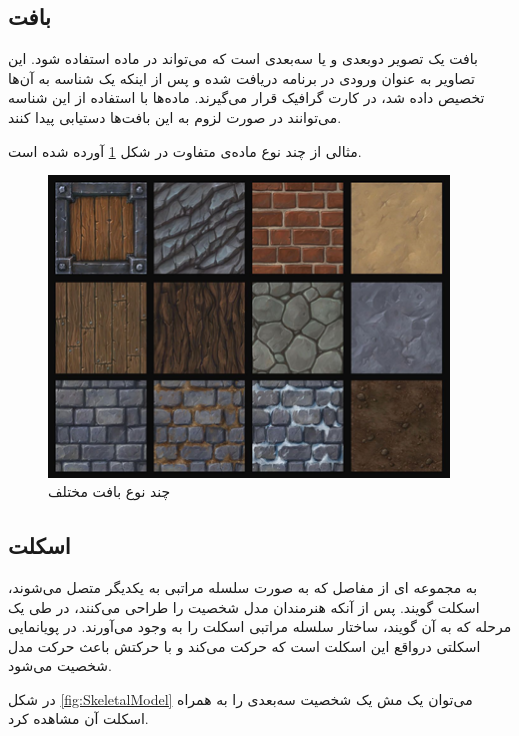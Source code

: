 \subsection{بافت
\protect{}
}
بافت یک تصویر دوبعدی و یا سه‌بعدی است که می‌تواند در ماده استفاده شود.
این تصاویر به عنوان ورودی در برنامه دریافت شده و پس از اینکه یک شناسه به آن‌ها تخصیص داده شد، در کارت گرافیک قرار می‌گیرند. ماده‌ها با استفاده از این شناسه می‌توانند در صورت لزوم به این بافت‌ها دستیابی پیدا کنند.

مثالی از چند نوع ماده‌ی متفاوت در شکل 
\ref{fig:Texture}
آورده‌ شده است.

\begin{figure}[ht]
	\centerline{\includegraphics[width=\textwidth,height=8cm,keepaspectratio]{Figures/Ch2/texture.png}}

	\caption{چند نوع بافت مختلف\cite{TextureSource}}
	\label{fig:Texture}
\end{figure}


\subsection{اسکلت}

به مجمو‌عه ای از مفاصل که به صورت سلسله مراتبی به یکدیگر متصل می‌شوند، اسکلت گویند. پس از آنکه هنرمندان مدل شخصیت را طراحی می‌کنند، در طی یک مرحله که به آن
گویند، ساختار سلسله مراتبی اسکلت را به وجود می‌آورند.
در پویانمایی اسکلتی درواقع این اسکلت‌ است که حرکت می‌کند و با حرکتش باعث حرکت مدل شخصیت می‌شود.

در شکل 
\ref{fig:SkeletalModel}
می‌توان یک مش یک شخصیت‌ ‌سه‌بعدی را به همراه اسکلت آن مشاهده کرد.


